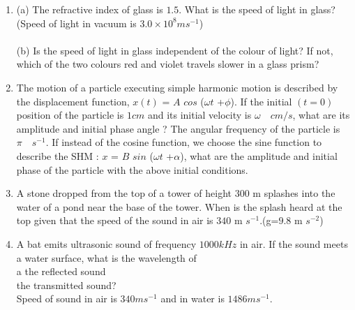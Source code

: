 \begin{enumerate}[label=\thesection.\arabic*,ref=\thesection.\theenumi]
\item
(a) The refractive index of glass is $1.5$. What is the speed of light in
glass?(Speed of light in vacuum is $3.0\times 10^{8} m s^{-1}$) \\
\\
(b) Is the speed of light in glass independent of the colour of light? If
not, which of the two colours red and violet travels slower in a
glass prism?\\
\solution
\pagebreak
\item
The motion of a particle executing simple harmonic motion is described by the
displacement function, $x(t)$ = $A$ $cos$ ($\omega$$t$ +$\phi$).
If the initial $(t = 0)$ position of the particle is $1 cm$ and its initial velocity is $\omega\quad cm/s$, what are its amplitude and initial phase angle ? The angular frequency of the particle is $\pi\quad s^{-1}$. If instead of the cosine function, we choose the sine function to describe the SHM : $x$ = $B$ $sin$ ($\omega$$t$ +$\alpha$), what are the amplitude and initial phase of the
particle with the above initial conditions.\\
\solution
\pagebreak

\item A stone dropped from the top of a tower of height $300$ m splashes into the water of a pond near the base of the tower. When is the splash heard at the top given that the speed of the sound in air is $340$ m $s^{-1}$.(g=$9.8$ m $s^{-2}$)\\
\solution
\pagebreak
\item A bat emits ultrasonic sound of frequency $1000 kHz$ in air. If the sound meets a water surface, what is the wavelength of\\[0pt] \brak a the reflected sound \\[0pt]
 the transmitted sound?\\
Speed of sound in air is $340 ms^{-1}$ and in water is $1486 ms^{-1}$.\\
\solution
\pagebreak
\end{enumerate}
